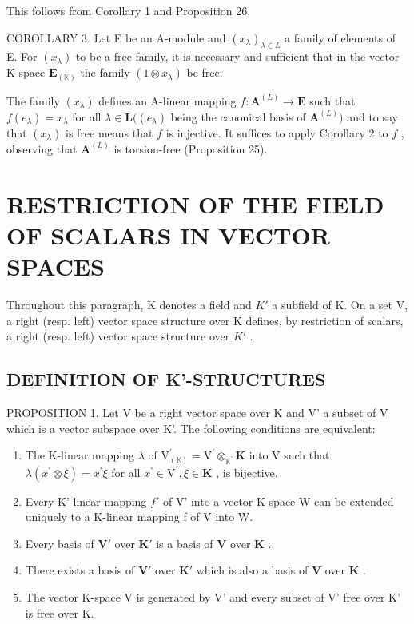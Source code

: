 This follows from Corollary 1 and Proposition 26.

COROLLARY 3. Let E be an A-module and \((x_{\lambda})_{\lambda \in L}\) a family of elements of E. For \((x_{\lambda})\) to be a free family, it is necessary and sufficient that in the vector K-space \(\mathbf{E}_{(\mathbb{K})}\) the family \((1 \otimes x_{\lambda})\) be free.

The family \((x_{\lambda})\) defines an A-linear mapping \(f: \mathbf{A}^{(L)} \to \mathbf{E}\) such that \(f(e_{\lambda}) = x_{\lambda}\) for all \(\lambda \in \mathbf{L}((e_{\lambda})\) being the canonical basis of \(\mathbf{A}^{(L)})\) and to say that \((x_{\lambda})\) is free means that \(f\) is injective. It suffices to apply Corollary 2 to \(f\) , observing that \(\mathbf{A}^{(L)}\) is torsion-free (Proposition 25).

\section{RESTRICTION OF THE FIELD OF SCALARS IN VECTOR SPACES}

Throughout this paragraph, K denotes a field and \(K'\) a subfield of K. On a set V, a right (resp. left) vector space structure over K defines, by restriction of scalars, a right (resp. left) vector space structure over \(K'\) .

\subsection{DEFINITION OF K'-STRUCTURES}

PROPOSITION 1. Let V be a right vector space over K and V' a subset of V which is a vector subspace over K'. The following conditions are equivalent:

\begin{enumerate}
\def\labelenumi{(\alph{enumi})}
\item
  The K-linear mapping \(\lambda\) of \(\mathrm{V}_{(\mathbb{K})}^{\prime} = \mathrm{V}^{\prime}\otimes_{\mathbb{K}^{\prime}}\mathbf{K}\) into V such that \(\lambda (x^{\prime}\otimes \xi) = x^{\prime}\xi\) for all \(x^{\prime}\in \mathrm{V}^{\prime},\xi \in \mathbf{K}\) , is bijective.
\item
  Every K'-linear mapping \(f'\) of V' into a vector K-space W can be extended uniquely to a K-linear mapping f of V into W.
\item
  Every basis of \(\mathbf{V}'\) over \(\mathbf{K}'\) is a basis of \(\mathbf{V}\) over \(\mathbf{K}\) .
\item
  There exists a basis of \(\mathbf{V}'\) over \(\mathbf{K}'\) which is also a basis of \(\mathbf{V}\) over \(\mathbf{K}\) .
\item
  The vector K-space V is generated by V' and every subset of V' free over K' is free over K.
\end{enumerate}

